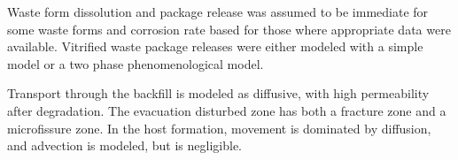 {%











Waste form dissolution and package release was assumed to be immediate for some
waste forms and corrosion rate based for those where appropriate data were
available. Vitrified waste package releases were either modeled with a simple
model or a two phase phenomenological model. 


Transport through the backfill is modeled as diffusive, with high permeability 
after degradation.  The evacuation disturbed zone has both a fracture zone and a 
microfissure zone.  In the host formation, movement is dominated by diffusion, 
and advection is modeled, but is negligible.



% 

}
